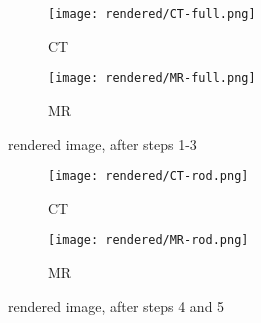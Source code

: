 \begin{figure}[!thb]

  \begin{subfigure}[b]{0.45\textwidth}
    \texttt{[image: rendered/CT-full.png]}
    \caption{CT}
    \label{fig:CT_full}
  \end{subfigure}
  \hfill
  \begin{subfigure}[b]{0.45\textwidth}
    \texttt{[image: rendered/MR-full.png]}
    \caption{MR}
    \label{fig:MR_full}
  \end{subfigure}
  \caption{rendered image, after steps 1-3}
  \label{fig:rendering1-3}
\end{figure}
  
\begin{figure}[!thb]
  \begin{subfigure}[b]{0.45\textwidth}
    \texttt{[image: rendered/CT-rod.png]}
    \caption{CT}
    \label{fig:CT_rod}
  \end{subfigure}
  \hfill
  \begin{subfigure}[b]{0.45\textwidth}
    \texttt{[image: rendered/MR-rod.png]}
    \caption{MR}
    \label{fig:MR_rod}
  \end{subfigure}
  
  \caption{rendered image, after steps 4 and 5}
  \label{fig:rendering4-5}
\end{figure}

